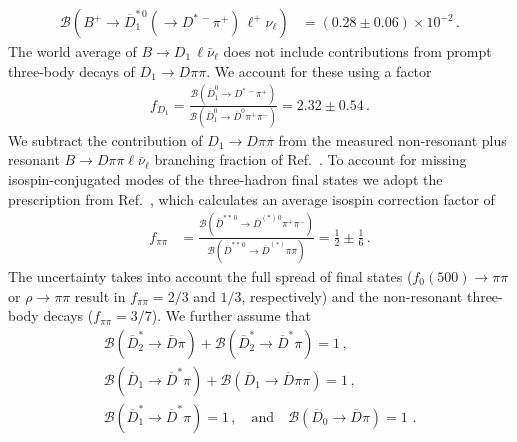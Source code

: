 \documentclass[twocolumn,aps,prd,superscriptaddress,nofootinbib,floatfix,preprintnumbers,a4]{revtex4-1}
\begin{document}
\begin{align}
 \mathcal{B}(B^+ \to \overline D_1^{*\, 0}(\to D^{*\,-} \pi^+) \, \ell^+ \nu_\ell) & = \left(0.28 \pm 0.06 \right) \times 10^{-2} \, .
\end{align}
The world average of $B \to D_1 \, \ell \bar \nu_\ell$ does not include contributions from prompt three-body decays of $D_1 \to D \pi \pi$. We account for these using a factor~\cite{Aaij:2011rj}
\begin{align}
 f_{D_1} = \frac{ \mathcal{B}(\overline D_1^0 \to D^{* \, -} \pi^+ )}{\mathcal{B}( \overline D_1^0 \to \overline D^{0} \pi^+ \pi^- )} = 2.32 \pm 0.54 \, .
\end{align}
We subtract the contribution of $D_1 \to D \pi \pi$ from the measured non-resonant plus resonant $B \to D \pi \pi \ell \bar \nu_\ell$ branching fraction of Ref.~\cite{Lees:2015eya}. To account for missing isospin-conjugated modes of the three-hadron final states we adopt the prescription from Ref.~\cite{Lees:2015eya}, which calculates an average isospin correction factor of 
\begin{align}
 f_{\pi\pi} &= \frac{ \mathcal{B}( \overline D^{**\,0} \to \overline D^{(*)\, 0} \pi^+ \pi^-) }{ \mathcal{B}( \overline D^{**\,0} \to \overline D^{(*)} \pi \pi) } = \frac{1}{2} \pm \frac{1}{6} \, .
\end{align}
The uncertainty takes into account the full spread of final states ($f_0(500) \to \pi \pi$ or $\rho \to \pi \pi$ result in $f_{\pi \pi} = 2/3$ and $1/3$, respectively) and the non-resonant three-body decays ($f_{\pi\pi} = 3/7$). We further assume that
\begin{align}
 \mathcal{B}(\overline D_2^{*} \to \overline D \pi) + \mathcal{B}(\overline D_2^{*} \to \overline D^* \pi) = 1 \, , \nonumber \\
 \mathcal{B}(\overline D_1 \to  \overline D^{*} \pi) + \mathcal{B}(\overline D_1 \to \overline D \pi\pi)  = 1 \, , \nonumber \\
  \mathcal{B}(\overline D_1^{*} \to \overline D^{*} \pi) = 1 \, , \quad \text{and} \quad
  \mathcal{B}(\overline D_0 \to  \overline D \pi)  = 1 \,  \, .
\end{align}
\end{document}
